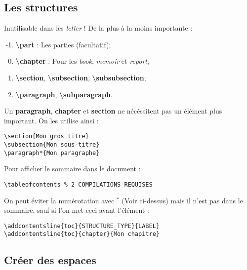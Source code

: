         \subsection{Les structures}
            Inutilisable dans les \textit{letter} ! De la plus à la moins importante :
            \begin{enumerate}
                \setcounter{enumi}{-2}
                \item \textbf{\textbackslash part} : Les parties (facultatif);
                \item \textbf{\textbackslash chapter} : Pour les \textit{book}, \textit{memoir} et \textit{report};
                \item \textbf{\textbackslash section}, \textbf{\textbackslash subsection}, \textbf{\textbackslash subsubsection};
                \item \textbf{\textbackslash paragraph}, \textbf{\textbackslash subparagraph}.
            \end{enumerate}
            Un \textbf{paragraph}, \textbf{chapter} et \textbf{section} ne nécéssitent pas un élément plus important. On les utilise ainsi :
            \begin{lstlisting}
\section{Mon gros titre}
\subsection{Mon sous-titre}
\paragraph*{Mon paragraphe}
            \end{lstlisting}
            Pour afficher le sommaire dans le document :
            \begin{lstlisting}
\tableofcontents % 2 COMPILATIONS REQUISES
            \end{lstlisting}
            On peut éviter la numérotation avec $^*$ (Voir ci-dessus) mais il n'est pas dans le sommaire, sauf si l'on met ceci avant l'élément :
            \begin{lstlisting}
\addcontentsline{toc}{STRUCTURE_TYPE}{LABEL}
\addcontentsline{toc}{chapter}{Mon chapitre}
            \end{lstlisting}
        \subsection{Créer des espaces}
